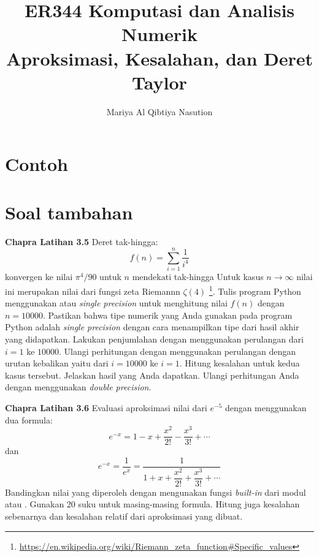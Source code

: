



\title{%
{\small ER344 Komputasi dan Analisis Numerik}\\
Aproksimasi, Kesalahan, dan Deret Taylor
}
\author{Mariya Al Qibtiya Nasution}
\date{}
\maketitle

\section{Contoh}








\section{Soal tambahan}

\begin{soal}
\textbf{Chapra Latihan 3.5}
Deret tak-hingga:
\begin{equation*}
f(n) = \sum_{i=1}^{n} \frac{1}{i^4}
\end{equation*}
konvergen ke nilai $\pi^{4}/90$ untuk $n$ mendekati tak-hingga
Untuk kasus $n \rightarrow \infty$ nilai ini merupakan nilai dari fungsi
zeta Riemannn $\zeta(4)$
\footnote{{\scriptsize\url{https://en.wikipedia.org/wiki/Riemann_zeta_function\#Specific_values}}}.
Tulis program Python menggunakan  atau
\textit{single precision} untuk menghitung
nilai $f(n)$ dengan $n=10000$.
Pastikan bahwa tipe numerik yang Anda gunakan pada program Python
adalah \textit{single precision} dengan cara menampilkan tipe dari hasil akhir yang didapatkan.
Lakukan penjumlahan dengan menggunakan perulangan
dari $i=1$ ke $10000$. Ulangi perhitungan dengan menggunakan perulangan
dengan urutan kebalikan yaitu dari $i=10000$ ke $i=1$. Hitung kesalahan untuk
kedua kasus tersebut.
Jelaskan hasil yang Anda dapatkan.
Ulangi perhitungan Anda dengan menggunakan \textit{double precision}.
\end{soal}

\begin{soal}
\textbf{Chapra Latihan 3.6}
Evaluasi aproksimasi nilai dari $e^{-5}$ dengan menggunakan dua formula:
\begin{equation}
e^{-x} = 1 - x + \frac{x^2}{2!} - \frac{x^3}{3!} + \cdots
\end{equation}
dan
\begin{equation}
e^{-x} = \frac{1}{e^{x}} = \frac{1}{1 + x + \dfrac{x^2}{2!} + \dfrac{x^3}{3!} + \cdots}
\end{equation}
Bandingkan nilai yang diperoleh dengan mengunakan fungsi \textit{built-in} dari modul
 atau . Gunakan 20 suku untuk masing-masing formula.
Hitung juga kesalahan sebenarnya dan kesalahan relatif dari aproksimasi yang dibuat.
\end{soal}


